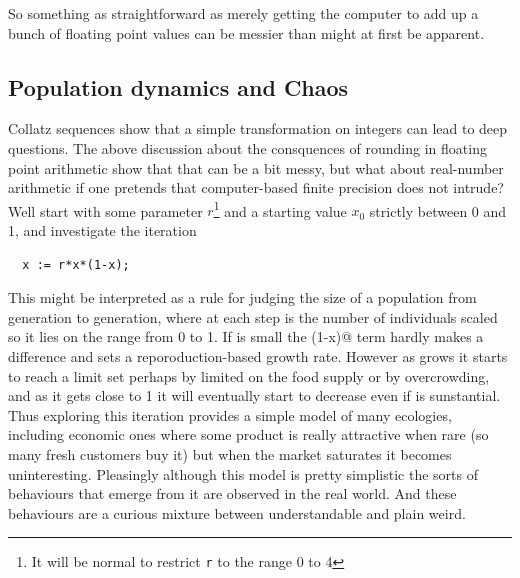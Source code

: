 So something as straightforward as merely getting the computer to
add up a bunch of floating point values can be messier than might
at first be apparent. 
\subsection{Population dynamics and Chaos}
Collatz sequences show that a simple transformation on integers can lead
to deep questions. The above discussion about the consquences of rounding
in floating point arithmetic show that that can be a bit messy, but what
about real-number arithmetic if one pretends that computer-based finite
precision does not intrude? Well start with some parameter $r$\footnote{
It will be normal to restrict \texttt{r} to the range 0 to 4} and
a starting value $x_{0}$ strictly between 0 and 1, and investigate the
iteration
\begin{verbatim}
  x := r*x*(1-x);
\end{verbatim}
This might be interpreted as a rule for judging the size of a population
from generation to generation, where at each step \verb@x@ is the number
of individuals scaled so it lies on the range from 0 to 1. If \verb@x@ is
small the \verb@(1-x)@ term hardly makes a difference and \verb@r@ sets
a reporoduction-based growth rate. However as \verb@x@ grows it starts to
reach a limit set perhaps by limited on the food supply or by overcrowding,
and as it gets close to 1 it will eventually start to decrease even if
\verb@r@ is sunstantial. Thus exploring this iteration provides a simple
model of many ecologies, including economic ones where some product is
really attractive when rare (so many fresh customers buy it) but when
the market saturates it becomes uninteresting. Pleasingly although this model
is pretty simplistic the sorts of behaviours that emerge from it are observed
in the real world. And these behaviours are a curious mixture between
understandable and plain weird.

